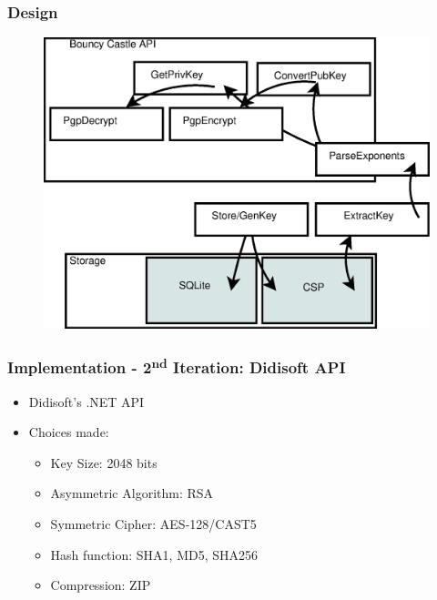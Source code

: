 \documentclass{beamer}
\begin{document}
\begin{frame}
\frametitle{Design}

\begin{figure}
\includegraphics[scale=0.4]{Diagram1}
\end{figure}

\end{frame}


\begin{frame}
\frametitle{Implementation - 2\textsuperscript{nd} Iteration: Didisoft API}

\begin{itemize}
\item Didisoft's .NET API
\item Choices made: 
\begin{itemize}
\item Key Size: 2048 bits \cite{p1}
\item Asymmetric Algorithm: RSA
\item Symmetric Cipher: AES-128/CAST5
\item Hash function: SHA1, MD5, SHA256
\item Compression: ZIP
\end{itemize}
\end{itemize}

\end{frame}

\end{document}
